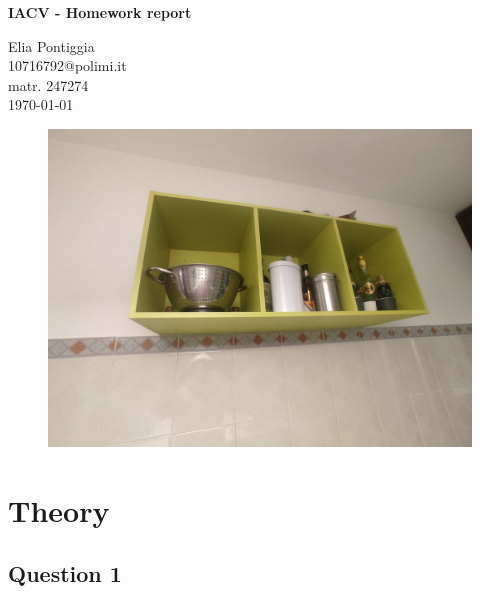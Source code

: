 \documentclass[a4paper, 11pt, oneside, openright, english]{article}
\begin{document}
\begin{center}
    {\Large \textbf{IACV - Homework report}}\\
    \vspace{2mm}

    {\large Elia Pontiggia}\\
    \vspace{2mm}
    {10716792@polimi.it}\\
    \vspace{2mm}
    {matr. 247274}\\
    \vspace{5mm}
    \today

    \vspace{5mm}

    \begin{figure}[H]
        \centering
        \includegraphics[width=1\textwidth]{homework.jpg}
    \end{figure}
\end{center}
\vspace{5mm}

\section{Theory}

\subsection{Question 1}
\end{document}
